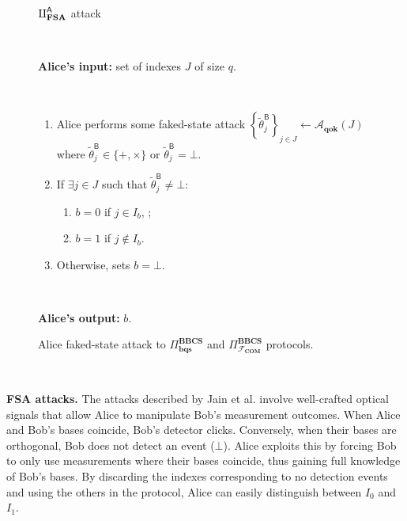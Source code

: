\begin{figure}[h!]
    \centering
        \begin{tcolorbox}
            
            \centerline{$\rotPi^{\mathsf{A}}_{\textbf{FSA}}$ attack}
            
            \
            
            \textbf{Alice's input:}  set of indexes $J$ of size $q$.
            
            \
 
 	\begin{enumerate}
         \item Alice performs some faked-state attack $\left\{\tilde{\theta}^{\mathsf{B}}_{j}\right\}_{j\in J} \leftarrow \mathcal{A}_{\textbf{qok}}(J) $ where $\tilde{\theta}^{\mathsf{B}}_{j}\in\{+, \times\}$ or $\tilde{\theta}^{\mathsf{B}}_{j}=\bot$. 
         \item If $\exists j\in J$ such that $\tilde{\theta}^{\mathsf{B}}_{j} \neq \bot$:
		\begin{enumerate}
            \item $b=0$ if $j\in I_b$, ;
            \item $b=1$ if $j\notin I_b$.
		\end{enumerate}
		\item Otherwise, sets $b = \bot$.
         
	\end{enumerate}            
            
            \
            
        \textbf{Alice's output:} $b$.

        
        \end{tcolorbox}
    \caption{Alice faked-state attack to $\Pi^{\textbf{BBCS}}_{\textbf{bqs}}$ and $\Pi^{\textbf{BBCS}}_{\mathcal{F}_\textbf{COM}}$ protocols.}
    \label{fig:A_FSA}
\end{figure}

\

\noindent\textbf{FSA attacks.} The attacks described by Jain et al. \cite{JSKEML16} involve well-crafted optical signals that allow Alice to manipulate Bob's measurement outcomes. When Alice and Bob's bases coincide, Bob's detector clicks. Conversely, when their bases are orthogonal, Bob does not detect an event ($\bot$). Alice exploits this by forcing Bob to only use measurements where their bases coincide, thus gaining full knowledge of Bob's bases. By discarding the indexes corresponding to no detection events and using the others in the protocol, Alice can easily distinguish between $I_0$ and $I_1$.

